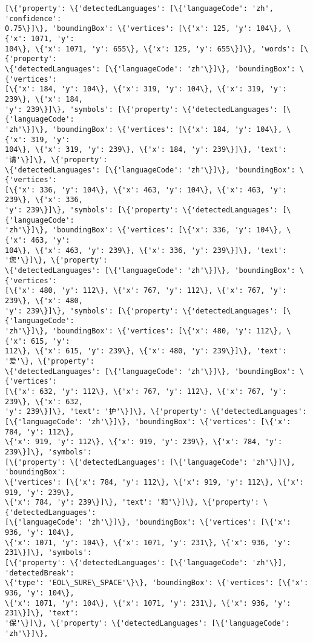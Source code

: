 \documentclass[11pt]{article}
\begin{document}
\begin{Verbatim}[commandchars=\\\{\}]
[\{'property': \{'detectedLanguages': [\{'languageCode': 'zh', 'confidence':
0.75\}]\}, 'boundingBox': \{'vertices': [\{'x': 125, 'y': 104\}, \{'x': 1071, 'y':
104\}, \{'x': 1071, 'y': 655\}, \{'x': 125, 'y': 655\}]\}, 'words': [\{'property':
\{'detectedLanguages': [\{'languageCode': 'zh'\}]\}, 'boundingBox': \{'vertices':
[\{'x': 184, 'y': 104\}, \{'x': 319, 'y': 104\}, \{'x': 319, 'y': 239\}, \{'x': 184,
'y': 239\}]\}, 'symbols': [\{'property': \{'detectedLanguages': [\{'languageCode':
'zh'\}]\}, 'boundingBox': \{'vertices': [\{'x': 184, 'y': 104\}, \{'x': 319, 'y':
104\}, \{'x': 319, 'y': 239\}, \{'x': 184, 'y': 239\}]\}, 'text': '请'\}]\}, \{'property':
\{'detectedLanguages': [\{'languageCode': 'zh'\}]\}, 'boundingBox': \{'vertices':
[\{'x': 336, 'y': 104\}, \{'x': 463, 'y': 104\}, \{'x': 463, 'y': 239\}, \{'x': 336,
'y': 239\}]\}, 'symbols': [\{'property': \{'detectedLanguages': [\{'languageCode':
'zh'\}]\}, 'boundingBox': \{'vertices': [\{'x': 336, 'y': 104\}, \{'x': 463, 'y':
104\}, \{'x': 463, 'y': 239\}, \{'x': 336, 'y': 239\}]\}, 'text': '您'\}]\}, \{'property':
\{'detectedLanguages': [\{'languageCode': 'zh'\}]\}, 'boundingBox': \{'vertices':
[\{'x': 480, 'y': 112\}, \{'x': 767, 'y': 112\}, \{'x': 767, 'y': 239\}, \{'x': 480,
'y': 239\}]\}, 'symbols': [\{'property': \{'detectedLanguages': [\{'languageCode':
'zh'\}]\}, 'boundingBox': \{'vertices': [\{'x': 480, 'y': 112\}, \{'x': 615, 'y':
112\}, \{'x': 615, 'y': 239\}, \{'x': 480, 'y': 239\}]\}, 'text': '爱'\}, \{'property':
\{'detectedLanguages': [\{'languageCode': 'zh'\}]\}, 'boundingBox': \{'vertices':
[\{'x': 632, 'y': 112\}, \{'x': 767, 'y': 112\}, \{'x': 767, 'y': 239\}, \{'x': 632,
'y': 239\}]\}, 'text': '护'\}]\}, \{'property': \{'detectedLanguages':
[\{'languageCode': 'zh'\}]\}, 'boundingBox': \{'vertices': [\{'x': 784, 'y': 112\},
\{'x': 919, 'y': 112\}, \{'x': 919, 'y': 239\}, \{'x': 784, 'y': 239\}]\}, 'symbols':
[\{'property': \{'detectedLanguages': [\{'languageCode': 'zh'\}]\}, 'boundingBox':
\{'vertices': [\{'x': 784, 'y': 112\}, \{'x': 919, 'y': 112\}, \{'x': 919, 'y': 239\},
\{'x': 784, 'y': 239\}]\}, 'text': '和'\}]\}, \{'property': \{'detectedLanguages':
[\{'languageCode': 'zh'\}]\}, 'boundingBox': \{'vertices': [\{'x': 936, 'y': 104\},
\{'x': 1071, 'y': 104\}, \{'x': 1071, 'y': 231\}, \{'x': 936, 'y': 231\}]\}, 'symbols':
[\{'property': \{'detectedLanguages': [\{'languageCode': 'zh'\}], 'detectedBreak':
\{'type': 'EOL\_SURE\_SPACE'\}\}, 'boundingBox': \{'vertices': [\{'x': 936, 'y': 104\},
\{'x': 1071, 'y': 104\}, \{'x': 1071, 'y': 231\}, \{'x': 936, 'y': 231\}]\}, 'text':
'保'\}]\}, \{'property': \{'detectedLanguages': [\{'languageCode': 'zh'\}]\},

\end{Verbatim}
\end{document}
